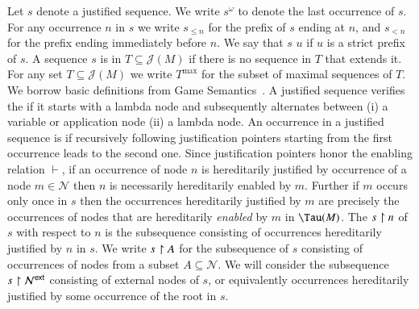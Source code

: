\documentclass{elsarticle}
\theoremstyle{plain}
\theoremstyle{definition}
\newcommand\Nodes{\mathcal{N}}%
\newcommand{\enables}{\vdash} %
\newcommand{\ctree}{\Tau} %
\newcommand{\ExternalNodes}{\Nodes^{\sf ext}}
\def\justseqset{\mathcal{J}}
\begin{document}
Let $s$ denote a justified sequence. We write $s^\omega$ to denote the last occurrence of $s$. For any occurrence $n$ in $s$ we write $s_{\leq n}$ for the prefix of $s$ ending at $n$, and $s_{<n}$ for the prefix ending immediately before $n$.
We say that $s$  $u$ if $u$ is a strict prefix of $s$.
A sequence $s$ is  in $T\subseteq \justseqset(M)$ if there is no sequence in $T$ that extends it.
%
For any set $T\subseteq \justseqset(M)$ we write $T^{\max}$ for the subset of maximal sequences of $T$.
%
We borrow basic definitions from Game Semantics~\cite{Abr02}. A justified sequence verifies the  if it starts with a lambda node and subsequently alternates between (i) a variable or application node (ii) a lambda node.
An occurrence in a justified sequence is  if recursively following justification pointers starting from the first occurrence leads to the second one.
Since justification pointers honor the enabling relation $\enables$, if an occurrence of node $n$ is hereditarily justified by occurrence of a node $m\in\Nodes$ then $n$ is necessarily hereditarily enabled by $m$. Further if $m$ occurs only once in $s$ then the occurrences hereditarily justified by $m$ are precisely the occurrences of nodes that are hereditarily \emph{enabled} by $m$ in $\ctree(M)$.
%
The  $s\upharpoonright n$ of $s$ with respect to $n$ is the subsequence consisting of occurrences hereditarily justified by $n$ in $s$. We write $s \upharpoonright A$ for the subsequence of $s$ consisting of occurrences of nodes from a subset $A \subseteq \Nodes$.
We will consider the subsequence $s\filter\ExternalNodes$ consisting of external nodes of $s$, or equivalently occurrences hereditarily justified by some occurrence of the root in $s$.
\end{document}
